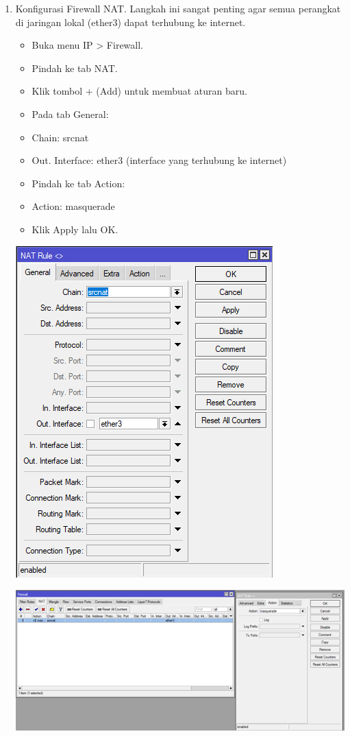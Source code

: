 \begin{enumerate}
\begin{enumerate}
\begin{center}
        \end{center}
        \item Konfigurasi Firewall NAT. Langkah ini sangat penting agar semua perangkat di jaringan lokal (ether3) dapat terhubung ke internet.
        \begin{itemize}
            \item Buka menu IP > Firewall.
            \item Pindah ke tab NAT.
            \item Klik tombol + (Add) untuk membuat aturan baru.
            \item Pada tab General:
            \item Chain: srcnat
            \item Out. Interface: ether3 (interface yang terhubung ke internet)
            \item Pindah ke tab Action:
            \item Action: masquerade
            \item Klik Apply lalu OK.
        \end{itemize}
        \begin{center}
            \includegraphics[scale=0.5]{P1/img/3 Konfigurasi DHCP Client 1.png}        
        \end{center}
        \begin{center}
            \includegraphics[scale=0.7]{P1/img/4 Hasil Konfigurasi DHCP Client.png}        

\end{center}
\end{enumerate}
\end{enumerate}
